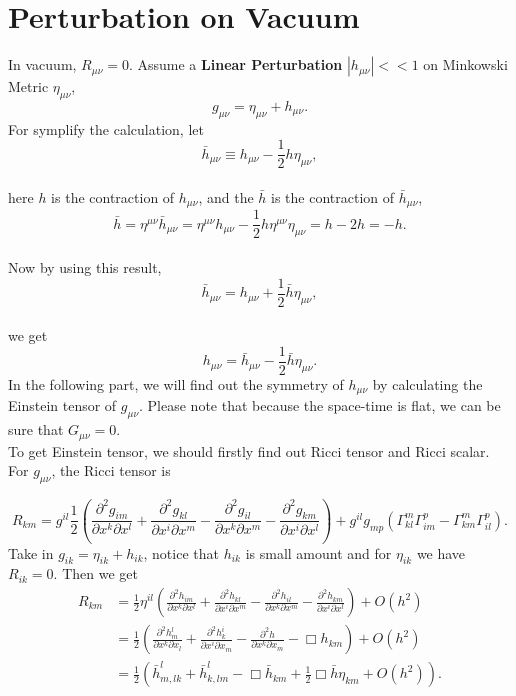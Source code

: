 \documentclass[openany,10pt]{book}
\theoremstyle{definition}
\theoremstyle{definition}
\theoremstyle{remark}
\begin{document}
\section{Perturbation on Vacuum}
In vacuum, $R_{\mu\nu}=0$.
Assume a \textbf{Linear Perturbation} $|h_{\mu\nu}|<<1$ on Minkowski Metric $\eta_{\mu\nu}$,
\begin{equation}
    g_{\mu\nu}=\eta_{\mu\nu}+h_{\mu\nu}.
\end{equation}
For symplify the calculation, let
\begin{equation}
    \bar{h}_{\mu\nu}\equiv h_{\mu\nu}-\frac12 h \eta_{\mu\nu},
\end{equation}\\
here $h$ is the contraction of $h_{\mu\nu}$, and the $\bar{h}$ is the contraction of $\bar{h}_{\mu\nu}$,
\begin{equation}
    \bar{h}=\eta^{\mu\nu}\bar{h}_{\mu\nu}=\eta^{\mu\nu}h_{\mu\nu}-\frac12 h \eta^{\mu\nu}\eta_{\mu\nu}=h-2h=-h.
\end{equation}\\
Now by using this result,
\begin{equation}
    \bar{h}_{\mu\nu}=h_{\mu\nu}+\frac12 \bar{h} \eta_{\mu\nu},
\end{equation}\\
we get 
\begin{equation}
   \boxed{ h_{\mu\nu}= \bar{h}_{\mu\nu}-\frac12 \bar{h} \eta_{\mu\nu}.}
\end{equation}
In the following part, we will find out the symmetry of $h_{\mu\nu}$ by calculating the Einstein tensor of $g_{\mu\nu}$. Please note that because the space-time is flat, we can be sure that $G_{\mu\nu}=0$.\\
To get Einstein tensor, we should firstly find out Ricci tensor and Ricci scalar. For $g_{\mu\nu}$, the Ricci tensor is 

\begin{equation}
R_{km}=g^{il}\frac{1}{2}(\frac{\partial^2g_{im}}{\partial x^k\partial x^l}+\frac{\partial^2g_{kl}}{\partial x^i\partial x^m}-\frac{\partial^2g_{il}}{\partial x^k\partial x^m}-\frac{\partial^2g_{km}}{\partial x^i\partial x^l})+g^{il}g_{mp}(\Gamma^m_{kl}\Gamma^p_{im}-\Gamma^m_{km}\Gamma^p_{il}).
\end{equation}
Take in $g_{ik}=\eta_{ik}+h_{ik}$, notice that $h_{ik}$ is small amount and for $\eta_{ik}$ we have $R_{ik}=0$. Then we get 
\begin{equation}
\begin{aligned}
R_{km}&=\frac{1}{2}\eta^{il}(\frac{\partial^2h_{im}}{\partial x^k\partial x^l}+\frac{\partial^2h_{kl}}{\partial x^i\partial x^m}-\frac{\partial^2h_{il}}{\partial x^k\partial x^m}-\frac{\partial^2h_{km}}{\partial x^i\partial x^l})+O(h^2)\\
&=\frac{1}{2}(\frac{\partial^2h^l_m}{\partial x^k\partial x_l}+\frac{\partial^2h^i_k}{\partial x^i\partial x_m}-\frac{\partial^2h}{\partial x^k\partial x_m}-\Box h_{km})+O(h^2)\\
&=\frac{1}{2}(\bar{h}^l_{m,lk}+\bar{h}^l_{k,lm}-\Box\bar{h}_{km}+\frac{1}{2}\Box\bar{h}\eta_{km}+O(h^2)). 
\end{aligned}
\end{equation}
\end{document}
